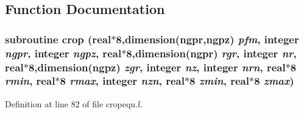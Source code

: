 \subsection{Function Documentation}
\hypertarget{cropequ_8f_8fbd92e0fb3fd378dbbc241a291b18ec}{
\subsubsection[crop]{\setlength{\rightskip}{0pt plus 5cm}subroutine crop (real$\ast$8,dimension(ngpr,ngpz) {\em pfm}, \/  integer {\em ngpr}, \/  integer {\em ngpz}, \/  real$\ast$8,dimension(ngpr) {\em rgr}, \/  integer {\em nr}, \/  real$\ast$8,dimension(ngpz) {\em zgr}, \/  integer {\em nz}, \/  integer {\em nrn}, \/  real$\ast$8 {\em rmin}, \/  real$\ast$8 {\em rmax}, \/  integer {\em nzn}, \/  real$\ast$8 {\em zmin}, \/  real$\ast$8 {\em zmax})}}
\label{cropequ_8f_8fbd92e0fb3fd378dbbc241a291b18ec}




Definition at line 82 of file cropequ.f.